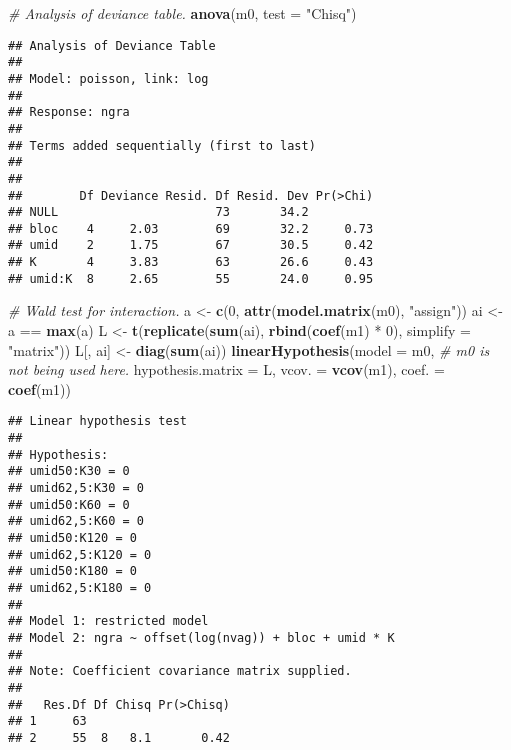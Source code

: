 \documentclass[9pt,a5paper,]{book}
\newenvironment{Shaded}{}{}
\newcommand{\KeywordTok}[1]{\textbf{{#1}}}
\newcommand{\DataTypeTok}[1]{\underline{{#1}}}
\newcommand{\DecValTok}[1]{{#1}}
\newcommand{\StringTok}[1]{{#1}}
\newcommand{\CommentTok}[1]{\textit{{#1}}}
\newcommand{\NormalTok}[1]{{#1}}
\renewenvironment{Shaded}{\color{inputcolor}}{}
\renewcommand{\DataTypeTok}[1]{{#1}}
\theoremstyle{definition}
\theoremstyle{definition}
\theoremstyle{remark}
\begin{document}
\begin{Shaded}
\begin{Highlighting}[]
\CommentTok{# Analysis of deviance table.}
\KeywordTok{anova}\NormalTok{(m0, }\DataTypeTok{test =} \StringTok{"Chisq"}\NormalTok{)}
\end{Highlighting}
\end{Shaded}

\begin{verbatim}
## Analysis of Deviance Table
## 
## Model: poisson, link: log
## 
## Response: ngra
## 
## Terms added sequentially (first to last)
## 
## 
##        Df Deviance Resid. Df Resid. Dev Pr(>Chi)
## NULL                      73       34.2         
## bloc    4     2.03        69       32.2     0.73
## umid    2     1.75        67       30.5     0.42
## K       4     3.83        63       26.6     0.43
## umid:K  8     2.65        55       24.0     0.95
\end{verbatim}

\begin{Shaded}
\begin{Highlighting}[]
\CommentTok{# Wald test for interaction.}
\NormalTok{a <-}\StringTok{ }\KeywordTok{c}\NormalTok{(}\DecValTok{0}\NormalTok{, }\KeywordTok{attr}\NormalTok{(}\KeywordTok{model.matrix}\NormalTok{(m0), }\StringTok{"assign"}\NormalTok{))}
\NormalTok{ai <-}\StringTok{ }\NormalTok{a ==}\StringTok{ }\KeywordTok{max}\NormalTok{(a)}
\NormalTok{L <-}\StringTok{ }\KeywordTok{t}\NormalTok{(}\KeywordTok{replicate}\NormalTok{(}\KeywordTok{sum}\NormalTok{(ai), }\KeywordTok{rbind}\NormalTok{(}\KeywordTok{coef}\NormalTok{(m1) *}\StringTok{ }\DecValTok{0}\NormalTok{), }\DataTypeTok{simplify =} \StringTok{"matrix"}\NormalTok{))}
\NormalTok{L[, ai] <-}\StringTok{ }\KeywordTok{diag}\NormalTok{(}\KeywordTok{sum}\NormalTok{(ai))}
\KeywordTok{linearHypothesis}\NormalTok{(}\DataTypeTok{model =} \NormalTok{m0, }\CommentTok{# m0 is not being used here.}
                 \DataTypeTok{hypothesis.matrix =} \NormalTok{L,}
                 \DataTypeTok{vcov. =} \KeywordTok{vcov}\NormalTok{(m1),}
                 \DataTypeTok{coef. =} \KeywordTok{coef}\NormalTok{(m1))}
\end{Highlighting}
\end{Shaded}

\begin{verbatim}
## Linear hypothesis test
## 
## Hypothesis:
## umid50:K30 = 0
## umid62,5:K30 = 0
## umid50:K60 = 0
## umid62,5:K60 = 0
## umid50:K120 = 0
## umid62,5:K120 = 0
## umid50:K180 = 0
## umid62,5:K180 = 0
## 
## Model 1: restricted model
## Model 2: ngra ~ offset(log(nvag)) + bloc + umid * K
## 
## Note: Coefficient covariance matrix supplied.
## 
##   Res.Df Df Chisq Pr(>Chisq)
## 1     63                    
## 2     55  8   8.1       0.42
\end{verbatim}
\end{document}
